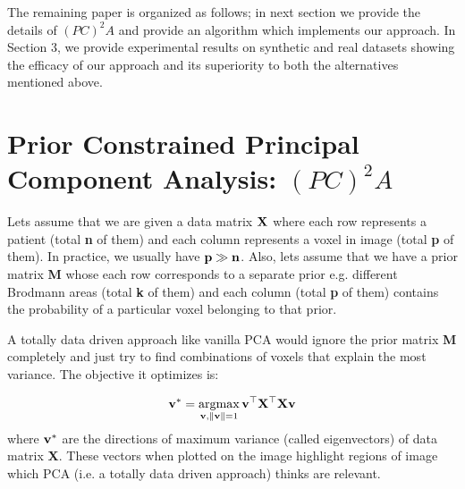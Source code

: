 \documentclass{llncs}
\newcommand{\argmax}{\operatornamewithlimits{argmax}}
\begin{document}
The remaining paper is organized as follows; in next section we provide the details of $(PC)^2A$ and provide an algorithm which implements our approach. In Section 3, we provide experimental results on synthetic and real datasets showing the efficacy of our approach and its superiority to both the alternatives mentioned above.


\section{ Prior Constrained Principal Component Analysis: $(PC)^2A$}
Lets assume that we are given a data matrix ${\bf X}$ where each row represents a patient (total {\bf n} of them) and each column represents a voxel in image (total {\bf p} of them). In practice, we usually have ${\bf p \gg n}$. Also, lets assume that we have a prior matrix {\bf M} whose each row corresponds to a separate prior e.g. different Brodmann areas (total {\bf k} of them) and each column (total {\bf p} of them) contains the probability of a particular voxel belonging to that prior.   

A totally data driven approach like vanilla PCA would ignore the prior matrix {\bf M} completely and just try to find combinations of voxels that explain the most variance. The objective it optimizes is:

\begin{equation}
{\bf v^*}= \argmax_{{\bf v},{\bf \|v\|}=1} {\bf v}^{\top}{\bf X^{\top}X}{\bf v}
\end{equation}
where {$\bf v^*$} are the directions of maximum variance (called eigenvectors) of data matrix {\bf X}. These vectors when plotted on the image highlight regions of image which PCA (i.e. a totally data driven approach) thinks are relevant.
\end{document}
